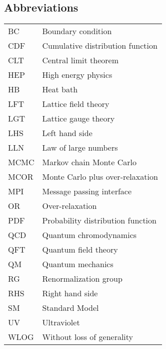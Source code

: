 \documentclass[12pt]{book}
\theoremstyle{definition}
\newenvironment{frontstuff}
  {\centering\chapter*{}}
  {\clearpage}
\begin{document}
\begin{frontstuff}
\section*{Abbreviations}
\begin{tabular}{ll}
BC      &       Boundary condition \\
CDF     &       Cumulative distribution function \\
CLT     &       Central limit theorem\\
HEP     &       High energy physics\\
HB      &       Heat bath\\
LFT     &       Lattice field theory\\
LGT     &       Lattice gauge theory\\
LHS     &       Left hand side\\
LLN     &       Law of large numbers\\
MCMC    &       Markov chain Monte Carlo\\
MCOR    &       Monte Carlo plus over-relaxation \\
MPI     &       Message passing interface \\
OR      &       Over-relaxation \\
PDF     &       Probability distribution function \\
QCD     &       Quantum chromodynamics \\
QFT     &       Quantum field theory \\
QM      &       Quantum mechanics \\
RG      &       Renormalization group \\
RHS     &       Right hand side \\
SM      &       Standard Model \\
UV      &       Ultraviolet \\
WLOG    &       Without loss of generality
\end{tabular}
\clearpage



\end{frontstuff}
\end{document}

